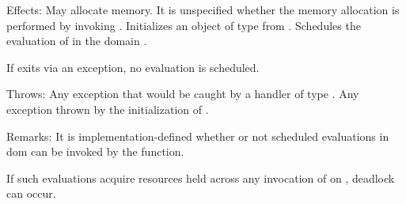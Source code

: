 \pnum
Effects: May allocate memory.
It is unspecified whether the memory allocation is performed by
invoking  .
Initializes an object  of type  from
.
Schedules the evaluation of  in the domain
.
\begin{note}
If  exits via an exception, no evaluation
is scheduled.
\end{note}

\pnum
Throws: Any exception that would be caught by a handler of type
.
Any exception thrown by the initialization of .

\pnum
Remarks: It is implementation-defined whether or not scheduled
evaluations in dom can be invoked by the 
function.
\begin{note}
If such evaluations acquire resources held across any invocation
of  on , deadlock can occur.
\end{note}
